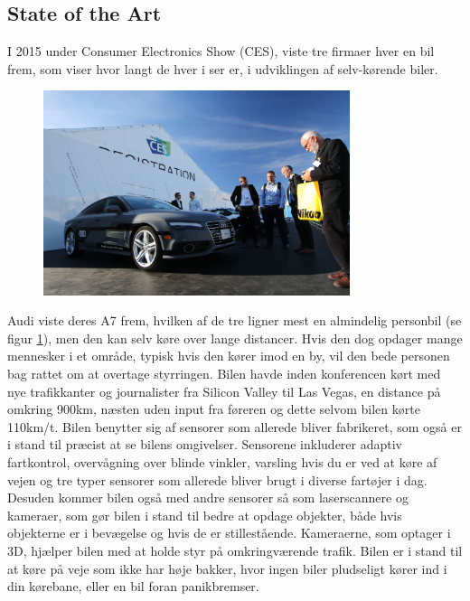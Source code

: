 \subsection{State of the Art} 
I 2015 under Consumer Electronics Show (CES), viste tre firmaer hver en bil frem, som viser hvor langt de hver i ser er, i udviklingen af selv-kørende biler.\cite{CES}
\begin{figure}[h!]
	\centering
	\includegraphics[width=0.8\textwidth]{images/150106_0345_ces.jpg}
	\label{fig:Audi_A7}
\end{figure}
Audi viste deres A7 frem, hvilken af de tre ligner mest en almindelig personbil (se figur \ref{fig:Audi_A7}), men den kan selv køre over lange distancer. Hvis den dog opdager mange mennesker i et område, typisk hvis den kører imod en by, vil den bede personen bag rattet om at overtage styrringen. Bilen havde inden konferencen kørt med nye trafikkanter og journalister fra Silicon Valley til Las Vegas, en distance på omkring 900km, næsten uden input fra føreren og dette selvom bilen kørte 110km/t. Bilen benytter sig af sensorer som allerede bliver fabrikeret, som også er i stand til præcist at se bilens omgivelser. Sensorene inkluderer adaptiv fartkontrol, overvågning over blinde vinkler, varsling hvis du er ved at køre af vejen og tre typer sensorer som allerede bliver brugt i diverse fartøjer i dag. Desuden kommer bilen også med andre sensorer så som laserscannere og kameraer, som gør bilen i stand til bedre at opdage objekter, både hvis objekterne er i bevægelse og hvis de er stillestående. Kameraerne, som optager i 3D, hjælper bilen med at holde styr på omkringværende trafik. Bilen er i stand til at køre på veje som ikke har høje bakker, hvor ingen biler pludseligt kører ind i din kørebane, eller en bil foran panikbremser.

